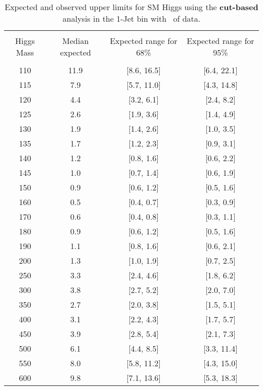 \begin{table}[hbp!]
\begin{center}
\begin{tabular}{c c c c}
\hline
\vspace{-3mm} && \\
 Higgs Mass   & Median expected & Expected range for 68\% & Expected range for 95\%   \\
\vspace{-3mm} && \\
\hline
110 & 11.9 & [8.6, 16.5] & [6.4, 22.1] \\
115 & 7.9 & [5.7, 11.0] & [4.3, 14.8] \\
120 & 4.4 & [3.2, 6.1] & [2.4, 8.2] \\
125 & 2.6 & [1.9, 3.6] & [1.4, 4.9] \\
130 & 1.9 & [1.4, 2.6] & [1.0, 3.5] \\
135 & 1.7 & [1.2, 2.3] & [0.9, 3.1] \\
140 & 1.2 & [0.8, 1.6] & [0.6, 2.2] \\
145 & 1.0 & [0.7, 1.4] & [0.6, 1.9] \\
150 & 0.9 & [0.6, 1.2] & [0.5, 1.6] \\
160 & 0.5 & [0.4, 0.7] & [0.3, 0.9] \\
170 & 0.6 & [0.4, 0.8] & [0.3, 1.1] \\
180 & 0.9 & [0.6, 1.2] & [0.5, 1.6] \\
190 & 1.1 & [0.8, 1.6] & [0.6, 2.1] \\
200 & 1.3 & [1.0, 1.9] & [0.7, 2.5] \\
250 & 3.3 & [2.4, 4.6] & [1.8, 6.2] \\
300 & 3.8 & [2.7, 5.2] & [2.0, 7.0] \\
350 & 2.7 & [2.0, 3.8] & [1.5, 5.1] \\
400 & 3.1 & [2.2, 4.3] & [1.7, 5.7] \\
450 & 3.9 & [2.8, 5.4] & [2.1, 7.3] \\
500 & 6.1 & [4.4, 8.5] & [3.3, 11.4] \\
550 & 8.0 & [5.8, 11.2] & [4.3, 15.0] \\
600 & 9.8 & [7.1, 13.6] & [5.3, 18.3] \\
\hline
\end{tabular}
\caption{Expected and observed upper limits for SM Higgs using the
  {\bf cut-based} analysis in the 1-Jet bin with \intlumiEightTeV\ of data.}
\label{tab:cutbase_uls_1j}
\end{center}
\end{table}

